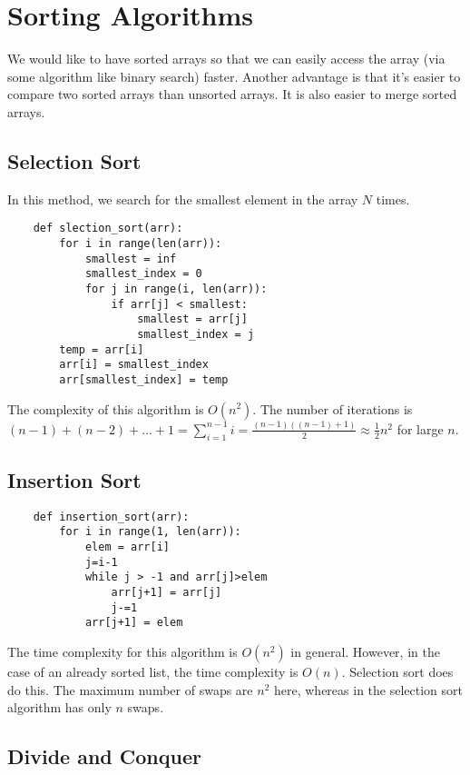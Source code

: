\documentclass[]{article}
\begin{document}
\section{Sorting Algorithms}\bigbreak

We would like to have sorted arrays so that we can easily access the array (via some algorithm like binary search) faster. Another advantage is that it's easier to compare two sorted arrays than unsorted arrays. It is also easier to merge sorted arrays.

\subsection{Selection Sort}\bigbreak

In this method, we search for the smallest element in the array $N$ times.

\begin{lstlisting}
	def slection_sort(arr):
		for i in range(len(arr)):
			smallest = inf
			smallest_index = 0
			for j in range(i, len(arr)):
				if arr[j] < smallest:
					smallest = arr[j]
					smallest_index = j
		temp = arr[i]
		arr[i] = smallest_index
		arr[smallest_index] = temp
\end{lstlisting}\bigbreak

The complexity of this algorithm is $O(n^2)$. The number of iterations is $(n-1) + (n-2) + ... + 1 = \sum_{i=1}^{n-1} i = \frac{(n-1)((n-1)+1)}{2} \approx \frac{1}{2}n^2$ for large $n$.\\

\subsection{Insertion Sort}\bigbreak

\begin{lstlisting}
	def insertion_sort(arr):
		for i in range(1, len(arr)):
			elem = arr[i]
			j=i-1
			while j > -1 and arr[j]>elem
				arr[j+1] = arr[j]
				j-=1
			arr[j+1] = elem
\end{lstlisting}\bigbreak

The time complexity for this algorithm is $O(n^2)$ in general. However, in the case of an already sorted list, the time complexity is $O(n)$. Selection sort does do this. The maximum number of swaps are $n^2$ here, whereas in the selection sort algorithm has only $n$ swaps. \\


\subsection{Divide and Conquer}\bigbreak
\end{document}
